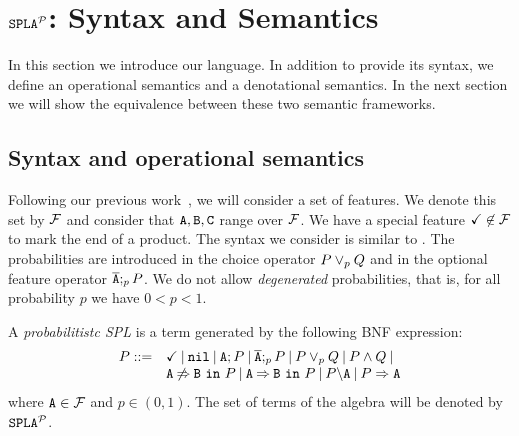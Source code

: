 \section{$\fodaPAp$: Syntax and Semantics}
\label{sec:stat:sintax}
In this section we introduce our language. In addition to provide its syntax, we define an operational semantics and a denotational semantics. In the next section we will show the equivalence between these two semantic frameworks.

\subsection{Syntax and operational semantics}
\label{sec:stat:sintax}
Following our previous work~\cite{acl13,cln16}, we will consider a
set of features. We denote this set by $\calF$ and consider that $\feature{A}, \feature{B},
\feature{C}$ range over $\calF$. We have a special feature
$\checkmark\not\in\calF$ to mark the end  of a product. The syntax we consider is similar to
\fodaPA. The probabilities are introduced in the choice operator $P \choice_{p} Q $ and in
the optional feature operator $\ofeature{A};_{p} P$. We do not allow
\emph{degenerated} probabilities, that is, for all probability $p$ we have $0< p<1$.

\bdfn
\label{sec:stat:sintax:dfn}
A \emph{probabilitistc SPL} is a term generated by the following
BNF expression:
$$
\begin{array}{ll}
P::=& \checkmark \barra \nil \barra \feature{A};P \barra
\ofeature{A};_{p} P \barra P \choice_{p} Q \barra P \paral Q \barra
\\
& \exclude{A}{B}{P}\barra  \require{A}{B}{P}\barra  \forbid{A}{P}\barra  \mandatory{A}{P}\\
\end{array}
$$
\noindent
where $\feature{A} \in \calF$ and $p\in(0,1)$. The set of terms of the
algebra will be denoted by  $\fodaPAp$.
\edfn
{}



